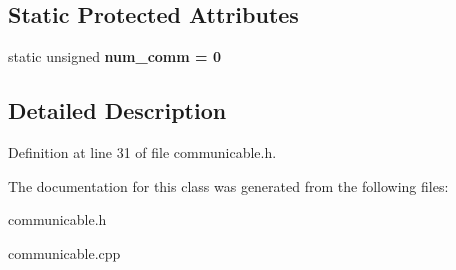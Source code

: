 \subsection*{Static Protected Attributes}
\begin{CompactItemize}
\item 
static unsigned \bf{num\_\-comm} = 0\label{class_communicable_7a6acfdc781a67c9c0ec4f17893f86c3}

\end{CompactItemize}


\subsection{Detailed Description}




Definition at line 31 of file communicable.h.

The documentation for this class was generated from the following files:\begin{CompactItemize}
\item 
communicable.h\item 
communicable.cpp\end{CompactItemize}
